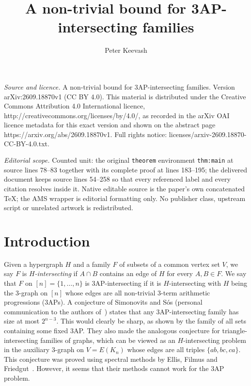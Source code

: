 \documentclass[10pt,a4paper]{amsart}
\newcommand{\1}{\mathbf 1}
\begin{document}
\title[A non-trivial bound for 3AP-intersecting families]{A non-trivial bound for 3AP-intersecting families}
\author{Peter Keevash}
\date{}
\maketitle
\noindent\emph{Source and licence.} A non-trivial bound for 3AP-intersecting families. Version arXiv:2609.18870v1 (CC BY 4.0). This material is distributed under the Creative Commons Attribution 4.0 International licence, http://creativecommons.org/licenses/by/4.0/, as recorded in the arXiv OAI licence metadata for this exact version and shown on the abstract page https://arxiv.org/abs/2609.18870v1. Full rights notice: licenses/arxiv-2609.18870-CC-BY-4.0.txt.\par\smallskip
\noindent\textit{Editorial scope.} Counted unit: the original \texttt{theorem} environment \texttt{thm:main} at source lines 78--83 together with its complete proof at lines 183--195; the delivered document keeps source lines 54--258 so that every referenced label and every citation resolves inside it. Native editable source is the paper's own concatenated TeX; the AMS wrapper is editorial formatting only. No publisher class, upstream script or unrelated artwork is redistributed.
\section{Introduction}

Given a hypergraph $H$ and a family $F$ of subsets of a common vertex set $V$,
we say $F$ is \emph{\(H\)-intersecting} if \(A\cap B\) contains an edge of $H$ for every \(A,B\in F\). 
We say that $F$ on $[n]=\{1,\dots,n\}$ is 3AP-intersecting if it is $H$-intersecting
with $H$ being the $3$-graph on $[n]$ whose edges are all non-trivial $3$-term arithmetic progressions (3APs).
A conjecture of Simonovits and S\'os (personal communication to the authors of~\cite{CGFS1986})
states that any 3AP-intersecting family has size at most $2^{n-3}$. This would clearly be sharp,
as shown by the family of all sets containing some fixed 3AP. They also made the analogous conjecture
for triangle-intersecting families of graphs, which can be viewed as an $H$-intersecting problem
in the auxiliary $3$-graph on $V=E(K_n)$ whose edges are all triples $\{ab,bc,ca\}$.
This conjecture was proved using spectral methods by Ellis, Filmus and Friedgut~\cite{EFF2012}. 
However, it seems that their methods cannot work for the 3AP problem.
\end{document}
